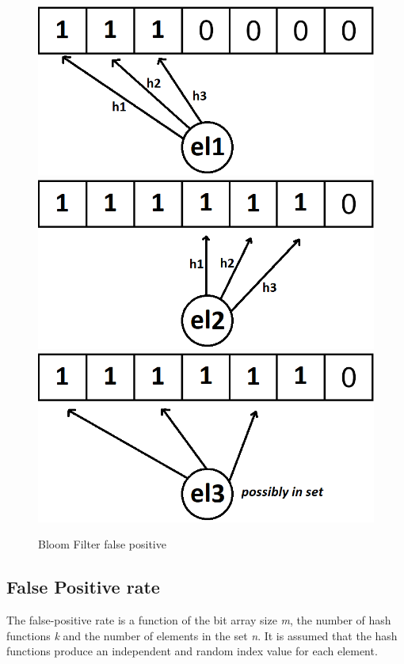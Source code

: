 \begin{figure}[!htb]
    \begin{center}
      \includegraphics[scale=0.4]{figures/fp-bloom-1.png}
      \includegraphics[scale=0.4]{figures/fp-bloom-2.png}
      \includegraphics[scale=0.4]{figures/fp-bloom-3.png}
      \caption{Bloom Filter false positive}
      \label{fig:bloom-filter-fp}
    \end{center}
\end{figure}


\subsection*{False Positive rate}
The false-positive rate is a function of the bit array size \textit{m}, the number of hash functions \textit{k} and the number of elements in the set \textit{n}. It is assumed that the hash functions produce an independent and random index value for each element. 


